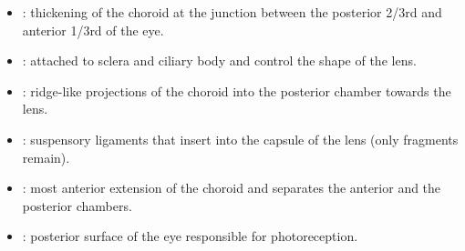 \begin{multicols}{2}
\begin{itemize}
  \item {}:  thickening of the choroid at the junction between the posterior 2/3rd and anterior 1/3rd of the eye. 
  
  \begin{center}
  \end{center}
  
  \item {}: attached to sclera and ciliary body and control the shape of the lens.
  
  \begin{center}
  \end{center}
  
  \item {}: ridge-like projections of the choroid into the posterior chamber towards the lens. 
  
  \begin{center}
  \end{center}
  
  \item {}: suspensory ligaments that insert into the capsule of the lens (only fragments remain).
  
  \begin{center}
  \end{center}
  
  \item {}: most anterior extension of the choroid and separates the anterior and the posterior chambers. 
  
  \begin{center}
  \end{center}
  
  \item {}: posterior surface of the eye responsible for photoreception.
  
  \begin{center}
  \end{center}
  

\end{itemize}
\end{multicols}
